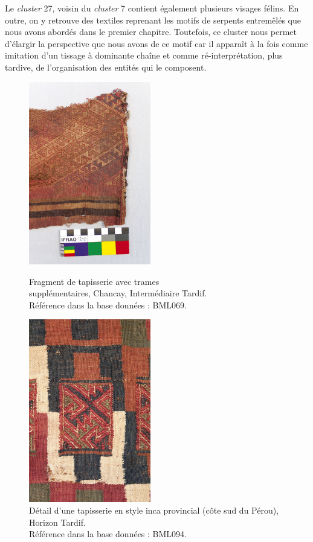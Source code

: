 Le \textit{cluster} 27, voisin du \textit{cluster} 7 contient également plusieurs visages félins. En outre, on y retrouve des textiles reprenant les motifs de serpents entremêlés que nous avons abordés dans le premier chapitre. Toutefois, ce cluster nous permet d'élargir la perspective que nous avons de ce motif car il apparaît à la fois comme imitation d'un tissage à dominante chaîne et comme ré-interprétation, plus tardive, de l'organisation des entités qui le composent.
\begin{figure}[!h]
    \begin{minipage}[c]{.5\linewidth}
            \begin{center}
                \includegraphics[height=8cm]{../images/BML069_avant.jpg}
                    \caption{Fragment de tapisserie avec trames \\ supplémentaires, Chancay, Intermédiaire Tardif. \\ Référence dans la base données : BML069.}
                \label{fig:BML069}   
            \end{center}
    \end{minipage}
    \hspace{5pt}
        \begin{minipage}[c]{.5\linewidth}
        \begin{center}
        		\includegraphics[height=8cm]{../images/BML094_detail.jpg}
		 \caption{Détail d'une tapisserie en style inca provincial (côte sud du Pérou), Horizon Tardif.\\ Référence dans la base données : BML094.}
		 \label{fig:BML094}
	\end{center}
    \end{minipage}
\end{figure}
